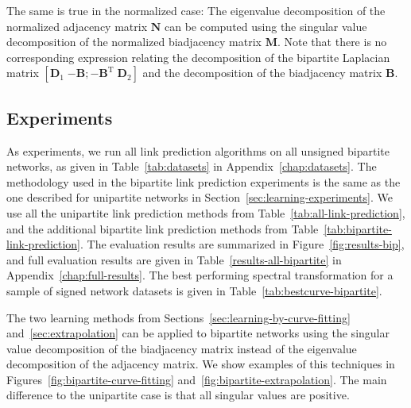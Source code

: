 \documentclass[11pt,a4paper]{book}
\begin{document}
The same is true in the normalized case:  The eigenvalue decomposition
of the normalized adjacency matrix $\mathbf N$ can be computed using the
singular value decomposition of the normalized biadjacency matrix
$\mathbf M$. 
Note that there is no corresponding expression relating the decomposition
of the bipartite Laplacian matrix $[\mathbf D_1 \; {-\mathbf B}; -\mathbf
  B^{\mathrm T} \; \mathbf D_2]$ and the decomposition of the biadjacency
matrix $\mathbf B$. 

\subsection{Experiments}
\label{sec:bipartite:experiments} 
As experiments, we run all link prediction algorithms on all unsigned
bipartite networks, as given in Table~\ref{tab:datasets} in
Appendix~\ref{chap:datasets}.  
The methodology used in the bipartite link prediction experiments is the
same as the one described for unipartite networks in
Section~\ref{sec:learning-experiments}. 
We use all the unipartite link prediction methods from
Table~\ref{tab:all-link-prediction}, and the additional bipartite link
prediction methods from Table~\ref{tab:bipartite-link-prediction}. 
The evaluation results are summarized in
Figure~\ref{fig:results-bip}, and full evaluation results are given in
Table~\ref{results-all-bipartite} in 
Appendix~\ref{chap:full-results}. 
The best performing spectral
transformation for a sample of signed network datasets is given in
Table~\ref{tab:bestcurve-bipartite}. 

The two learning methods from
Sections~\ref{sec:learning-by-curve-fitting} and~\ref{sec:extrapolation}  
can be applied to bipartite networks using the singular value
decomposition of the biadjacency matrix instead of the eigenvalue
decomposition of the adjacency matrix.  We show examples of this techniques
in Figures~\ref{fig:bipartite-curve-fitting} and~\ref{fig:bipartite-extrapolation}.  
The main difference to the unipartite case is that all singular values 
are positive. 
\end{document}
